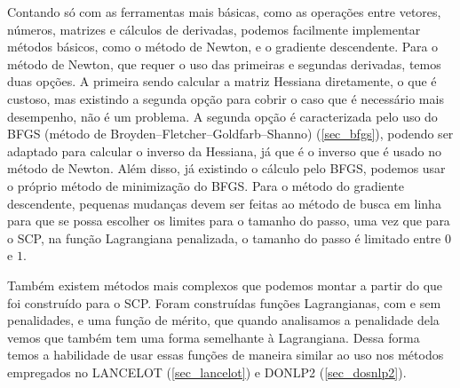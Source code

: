 Contando só com as ferramentas mais básicas, como as operações entre vetores, números,
matrizes e cálculos de derivadas, podemos facilmente implementar métodos básicos, como
o método de Newton, e o gradiente descendente. Para o método de Newton, que requer o
uso das primeiras e segundas derivadas, temos duas opções. A primeira sendo calcular
a matriz Hessiana diretamente, o que é custoso, mas existindo a segunda opção para
cobrir o caso que é necessário mais desempenho, não é um problema. A segunda opção
é caracterizada pelo uso do BFGS (método de Broyden–Fletcher–Goldfarb–Shanno) (\ref{sec_bfgs}),
podendo ser adaptado para calcular o inverso da Hessiana, já que é o inverso que é usado no
método de Newton. Além disso, já existindo o cálculo pelo BFGS, podemos usar o próprio método
de minimização do BFGS. Para o método do gradiente descendente, pequenas mudanças devem
ser feitas ao método de busca em linha para que se possa escolher os limites para o tamanho
do passo, uma vez que para o SCP, na função Lagrangiana penalizada, o tamanho do passo é limitado
entre \(0\) e \(1\).

Também existem métodos mais complexos que podemos montar a partir do que foi construído
para o SCP. Foram construídas funções Lagrangianas, com e sem penalidades, e uma função
de mérito, que quando analisamos a penalidade dela vemos que também tem uma forma semelhante
à Lagrangiana. Dessa forma temos a habilidade de usar essas funções de maneira similar ao uso
nos métodos empregados no LANCELOT (\ref{sec_lancelot}) e DONLP2 (\ref{sec_dosnlp2}).